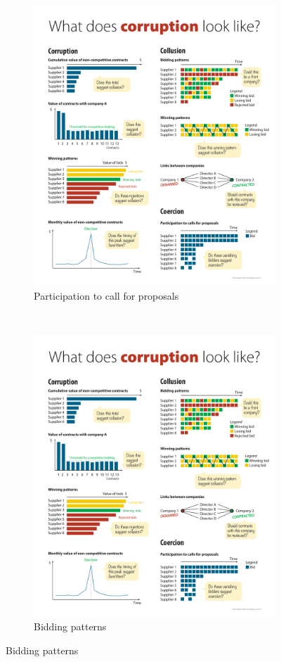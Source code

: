 \begin{figure}[H]
\ContinuedFloat

\begin{subfigure}[t]{0.5\textwidth}
\caption{Participation to call for proposals}
\label{fig_proposals}
\includegraphics[max width=1\textwidth]{../img/poster_coercion.pdf}
\end{subfigure}
~
\begin{subfigure}[t]{0.5\textwidth}
\caption{Bidding patterns}
\label{fig_bid2}
\includegraphics[max width=1\textwidth]{../img/poster_win_pattern.pdf}

\end{subfigure}
\end{figure}
